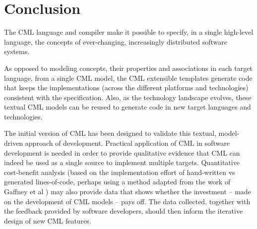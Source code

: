 \section{Conclusion}\label{sec:conclusion}

The CML language and compiler make it possible to specify,
in a single high-level language,
the concepts of ever-changing, increasingly distributed software systems.

As opposed to modeling concepts, their properties and associations in each target language,
from a single CML model,
the CML extensible templates generate code that
keeps the implementations 
(across the different platforms and technologies) 
consistent with the specification.
Also, as the technology landscape evolves,
these textual CML models can be reused to generate code in new target languages and technologies.

The initial version of CML has been designed to validate this textual, model-driven approach of development.
Practical application of CML in software development is needed in order to provide qualitative evidence that
CML can indeed be used as a single source to implement multiple targets.
Quantitative cost-benefit analysis
(based on the implementation effort of hand-written vs generated lines-of-code, perhaps using a method adapted from the work of Gaffney et al \cite{gaffney})
may also provide data
that shows whether the investment -- made on the development of CML models -- pays off. The data collected, together with the feedback provided by software developers, should then inform the iterative design of new CML features.
